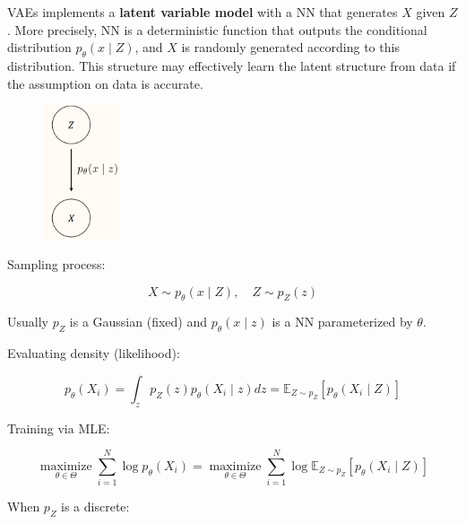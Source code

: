 \begin{definition}
    VAEs implements a \textbf{latent variable model} with a NN that generates $X$ given $Z$. More precisely, NN is a deterministic function that outputs the conditional distribution $p_{\theta}(x \mid Z)$, and $X$ is randomly generated according to this distribution. This structure may effectively learn the latent structure from data if the assumption on data is accurate.

    \par\noindent\textcolor{gray}{\hdashrule{\textwidth}{0.4pt}{1pt 2pt}}

    \begin{figure}[H]
        \centering
        \includegraphics[width=0.2\textwidth]{.././assets/11.2.png}
    \end{figure}

    Sampling process:

    $$
    X \sim p_{\theta}(x \mid Z), \quad Z \sim p_{Z}(z)
    $$

    Usually $p_{Z}$ is a Gaussian (fixed) and $p_{\theta}(x \mid z)$ is a NN parameterized by $\theta$.

    Evaluating density (likelihood):

    $$
    p_{\theta}\left(X_{i}\right)=\int_{z} p_{Z}(z) p_{\theta}\left(X_{i} \mid z\right) d z=\mathbb{E}_{Z \sim p_{Z}}\left[p_{\theta}\left(X_{i} \mid Z\right)\right]
    $$

    Training via MLE:

    $$
    \underset{\theta \in \Theta}{\operatorname{maximize}} \sum_{i=1}^{N} \log p_{\theta}\left(X_{i}\right)=\underset{\theta \in \Theta}{\operatorname{maximize}} \sum_{i=1}^{N} \log \mathbb{E}_{Z \sim p_{Z}}\left[p_{\theta}\left(X_{i} \mid Z\right)\right]
    $$

    \par\noindent\textcolor{gray}{\hdashrule{\textwidth}{0.4pt}{1pt 2pt}}

    When $p_{Z}$ is a discrete:


\end{definition}
